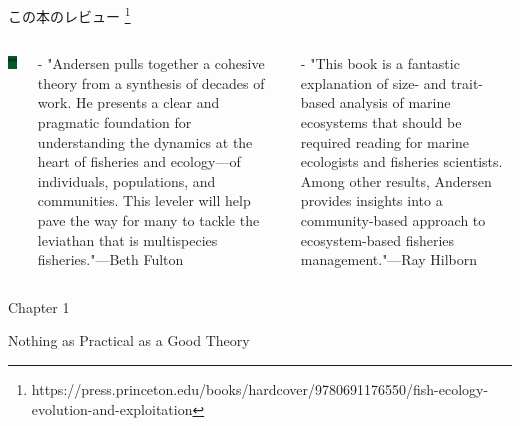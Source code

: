 \documentclass[
  ignorenonframetext,
]{beamer}
\newcommand{\vspacesmall}{\vspace{3mm}}
\begin{document}
\begin{frame}{この本のレビュー
\footnote[frame]{https://press.princeton.edu/books/hardcover/9780691176550/fish-ecology-evolution-and-exploitation}}
\protect\hypertarget{ux3053ux306eux672cux306eux30ecux30d3ux30e5ux30fc}{}

\begin{columns}


\includegraphics[width=80px]{FishEcoEvoBook} 


- "Andersen pulls together a cohesive theory from a synthesis of decades of work. He presents a clear and pragmatic foundation for understanding the dynamics at the heart of fisheries and ecology—of individuals, populations, and communities. This leveler will help pave the way for many to tackle the leviathan that is multispecies fisheries."—Beth Fulton

\vspacesmall
- "This book is a fantastic explanation of size- and trait-based analysis of marine ecosystems that should be required reading for marine ecologists and fisheries scientists. Among other results, Andersen provides insights into a community-based approach to ecosystem-based fisheries management."—Ray Hilborn

\end{columns}

\end{frame}

\begin{frame}

\begin{LARGE} 
\begin{center}
\begin{bf}
Chapter 1  
  
Nothing as Practical as a Good Theory
\end{bf}
\end{center}
\end{LARGE}

\end{frame}
\end{document}
